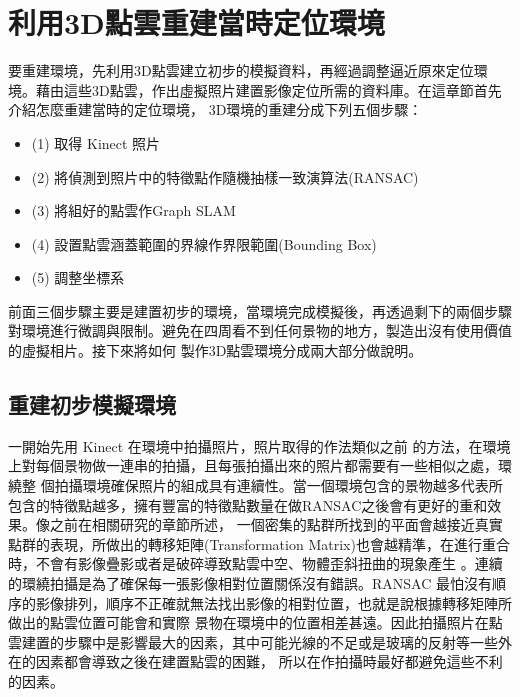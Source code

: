 % 
\section{利用3D點雲重建當時定位環境}

   要重建環境，先利用3D點雲建立初步的模擬資料，再經過調整逼近原來定位環境。藉由這些3D點雲，作出虛擬照片建置影像定位所需的資料庫。在這章節首先介紹怎麼重建當時的定位環境，
   3D環境的重建分成下列五個步驟：

\begin{itemize}
	\item (1) 取得 Kinect 照片
    \item (2) 將偵測到照片中的特徵點作隨機抽樣一致演算法(RANSAC)
    \item (3) 將組好的點雲作Graph SLAM
    \item (4) 設置點雲涵蓋範圍的界線作界限範圍(Bounding Box)
    \item (5) 調整坐標系
\end{itemize}   
   
   前面三個步驟主要是建置初步的環境，當環境完成模擬後，再透過剩下的兩個步驟對環境進行微調與限制。避免在四周看不到任何景物的地方，製造出沒有使用價值的虛擬相片。接下來將如何
   製作3D點雲環境分成兩大部分做說明。
   
%
\subsection{重建初步模擬環境}
   一開始先用 Kinect 在環境中拍攝照片，照片取得的作法類似之前 \cite{Du2011}的方法，在環境上對每個景物做一連串的拍攝，且每張拍攝出來的照片都需要有一些相似之處，環繞整
   個拍攝環境確保照片的組成具有連續性。當一個環境包含的景物越多代表所包含的特徵點越多，擁有豐富的特徵點數量在做RANSAC之後會有更好的重和效果。像之前在相關研究的章節所述，
   一個密集的點群所找到的平面會越接近真實點群的表現，所做出的轉移矩陣(Transformation Matrix)也會越精準，在進行重合時，不會有影像疊影或者是破碎導致點雲中空、物體歪斜扭曲的現象產生
   。連續的環繞拍攝是為了確保每一張影像相對位置關係沒有錯誤。RANSAC 最怕沒有順序的影像排列，順序不正確就無法找出影像的相對位置，也就是說根據轉移矩陣所做出的點雲位置可能會和實際
   景物在環境中的位置相差甚遠。因此拍攝照片在點雲建置的步驟中是影響最大的因素，其中可能光線的不足或是玻璃的反射等一些外在的因素都會導致之後在建置點雲的困難，
   所以在作拍攝時最好都避免這些不利的因素。
     
